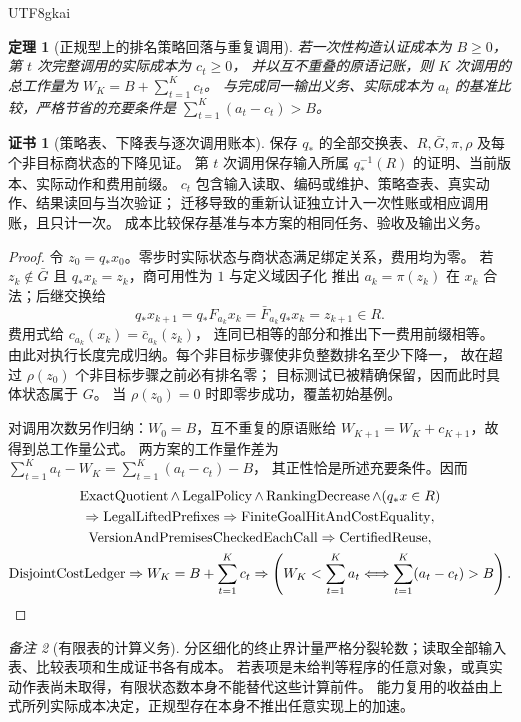 \documentclass[12pt,a4paper,openany,notitlepage]{report}
\theoremstyle{plain}
\newtheorem{theorem}{定理}[chapter]
\theoremstyle{definition}
\newtheorem*{certificate}{证书}
\theoremstyle{remark}
\newtheorem{remark}[theorem]{备注}
\begin{document}
\begin{CJK*}{UTF8}{gkai}
\begin{theorem}[正规型上的排名策略回落与重复调用]
若一次性构造认证成本为 $B\ge0$，第 $t$ 次完整调用的实际成本为 $c_t\ge0$，
并以互不重叠的原语记账，则 $K$ 次调用的总工作量为
$W_K=B+\sum_{t=1}^Kc_t$。
与完成同一输出义务、实际成本为 $a_t$ 的基准比较，严格节省的充要条件是
$\sum_{t=1}^K(a_t-c_t)>B$。
\end{theorem}
\begin{certificate}[策略表、下降表与逐次调用账本]
保存 $q_*$ 的全部交换表、$R,\bar G,\pi,\rho$ 及每个非目标商状态的下降见证。
第 $t$ 次调用保存输入所属 $q_*^{-1}(R)$ 的证明、当前版本、实际动作和费用前缀。
$c_t$ 包含输入读取、编码或维护、策略查表、真实动作、结果读回与当次验证；
迁移导致的重新认证独立计入一次性账或相应调用账，且只计一次。
成本比较保存基准与本方案的相同任务、验收及输出义务。
\end{certificate}
\begin{proof}
令 $z_0=q_*x_0$。零步时实际状态与商状态满足绑定关系，费用均为零。
若 $z_k\notin\bar G$ 且 $q_*x_k=z_k$，商可用性为 $1$ 与定义域因子化
推出 $a_k=\pi(z_k)$ 在 $x_k$ 合法；后继交换给
\[
 q_*x_{k+1}=q_*F_{a_k}x_k
 =\bar F_{a_k}q_*x_k=z_{k+1}\in R.
\]
费用式给 $c_{a_k}(x_k)=\bar c_{a_k}(z_k)$，
连同已相等的部分和推出下一费用前缀相等。
由此对执行长度完成归纳。每个非目标步骤使非负整数排名至少下降一，
故在超过 $\rho(z_0)$ 个非目标步骤之前必有排名零；
目标测试已被精确保留，因而此时具体状态属于 $G$。
当 $\rho(z_0)=0$ 时即零步成功，覆盖初始基例。

对调用次数另作归纳：$W_0=B$，互不重复的原语账给
$W_{K+1}=W_K+c_{K+1}$，故得到总工作量公式。
两方案的工作量作差为
$\sum_{t=1}^Ka_t-W_K=\sum_{t=1}^K(a_t-c_t)-B$，
其正性恰是所述充要条件。因而
\begin{gather*}
 \operatorname{ExactQuotient}\land\operatorname{LegalPolicy}
 \land\operatorname{RankingDecrease}\land(q_*x\in R)\\
 \Rightarrow\operatorname{LegalLiftedPrefixes}
 \Rightarrow\operatorname{FiniteGoalHitAndCostEquality},\\
 \operatorname{VersionAndPremisesCheckedEachCall}
 \Rightarrow\operatorname{CertifiedReuse},\\
 \operatorname{DisjointCostLedger}
 \Rightarrow W_K=B+\sum_{t=1}^Kc_t
 \Rightarrow\left(W_K<\sum_{t=1}^Ka_t
 \Longleftrightarrow\sum_{t=1}^K(a_t-c_t)>B\right).\qedhere
\end{gather*}
\end{proof}

\begin{remark}[有限表的计算义务]
分区细化的终止界计量严格分裂轮数；读取全部输入表、比较表项和生成证书各有成本。
若表项是未给判等程序的任意对象，或真实动作表尚未取得，有限状态数本身不能替代这些计算前件。
能力复用的收益由上式所列实际成本决定，正规型存在本身不推出任意实现上的加速。
\end{remark}



\end{CJK*}
\end{document}
